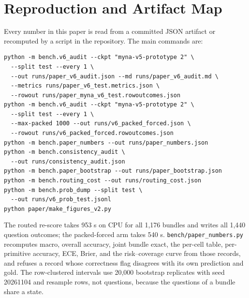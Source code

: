 \appendix

\section{Reproduction and Artifact Map}
\label{app:extra}

Every number in this paper is read from a committed JSON artifact or recomputed by a script in the
repository. The main commands are:

{\scriptsize
\begin{verbatim}
python -m bench.v6_audit --ckpt "myna-v5-prototype 2" \
  --split test --every 1 \
  --out runs/paper_v6_audit.json --md runs/paper_v6_audit.md \
  --metrics runs/paper_v6_test.metrics.json \
  --rowout runs/paper_myna_v6_test.rowoutcomes.json
python -m bench.v6_audit --ckpt "myna-v5-prototype 2" \
  --split test --every 1 \
  --max-packed 1000 --out runs/v6_packed_forced.json \
  --rowout runs/v6_packed_forced.rowoutcomes.json
python -m bench.paper_numbers --out runs/paper_numbers.json
python -m bench.consistency_audit \
  --out runs/consistency_audit.json
python -m bench.paper_bootstrap --out runs/paper_bootstrap.json
python -m bench.routing_cost --out runs/routing_cost.json
python -m bench.prob_dump --split test \
  --out runs/v6_prob_test.jsonl
python paper/make_figures_v2.py
\end{verbatim}
}

The routed re-score takes 953 s on CPU for all 1{,}176 bundles and writes all 1{,}440 question
outcomes; the packed-forced arm takes 540 s. \texttt{bench/paper\_numbers.py} recomputes macro,
overall accuracy, joint bundle exact, the per-cell table, per-primitive accuracy, ECE, Brier, and
the risk--coverage curve from those records, and refuses a record whose correctness flag disagrees
with its own prediction and gold. The row-clustered intervals use 20{,}000 bootstrap replicates with
seed 20261104 and resample rows, not questions, because the questions of a bundle share a state.

